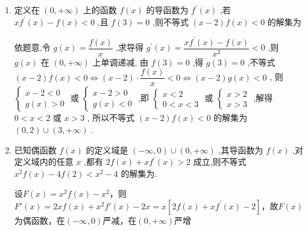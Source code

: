 \begin{enumerate}
        \item 定义在 $\left( {0, + \infty }\right)$ 上的函数 $f\left( x\right)$ 的导函数为 ${f}^{\prime }\left( x\right)$ ,若 $x{f}^{\prime }\left( x\right)  - f\left( x\right)  < 0$ ,且 $f\left( 3\right)  = 0$ ,则不等式 $\left( {x - 2}\right) f\left( x\right)  < 0$ 的解集为
        \begin{jieda}
            依题意,令 $g\left( x\right)  = \dfrac{f\left( x\right) }{x}$ ,求导得 ${g}^{\prime }\left( x\right)  = \dfrac{x{f}^{\prime }\left( x\right)  - f\left( x\right) }{{x}^{2}} < 0$ ,则 $g\left( x\right)$ 在 $\left( {0, + \infty }\right)$ 上单调递减, 由 $f\left( 3\right)  = 0$ ,得 $g\left( 3\right)  = 0$ ,不等式 $\left( {x - 2}\right) f\left( x\right)  < 0 \Longleftrightarrow  \left( {x - 2}\right)  \cdot  \dfrac{f\left( x\right) }{x} < 0 \Longleftrightarrow  \left( {x - 2}\right) g\left( x\right)  < 0$ , 则 $\left\{  \begin{array}{l} x - 2 < 0 \\  g\left( x\right)  > 0 \end{array}\right.$ 或 $\left\{  \begin{array}{l} x - 2 > 0 \\  g\left( x\right)  < 0 \end{array}\right.$ ,即 $\left\{  \begin{matrix} x < 2 \\  0 < x < 3 \end{matrix}\right.$ 或 $\left\{  \begin{array}{l} x > 2 \\  x > 3 \end{array}\right.$ ,解得 $0 < x < 2$ 或 $x > 3$ , 所以不等式 $\left( {x - 2}\right) f\left( x\right)  < 0$ 的解集为 $\left( {0,2}\right)  \cup  \left( {3, + \infty }\right)$ .
        \end{jieda}
        
        \item 已知偶函数 $f\left( x\right)$ 的定义域是 $\left( {-\infty ,0}\right)  \cup  \left( {0, + \infty }\right)$ ,其导函数为 $f\left( x\right)$ ,对定义域内的任意 $x$ ,都有 ${2f}\left( x\right)  + x{f}^{\prime }\left( x\right)  > 2$ 成立,则不等式 ${x}^{2}f\left( x\right)  - {4f}\left( 2\right)  < {x}^{2} - 4$ 的解集为.
        \begin{jieda}
            设$F(x) = x^2f(x)-x^2$，则$F'(x) = 2xf(x)+x^2f'(x)-2x = x[{2f}\left( x\right)  + x{f}^{\prime }\left( x\right)-2]$，故$F(x)$为偶函数，在$(-\infty, 0)$严减，在$(0, +\infty)$严增


\end{jieda}
\end{enumerate}
